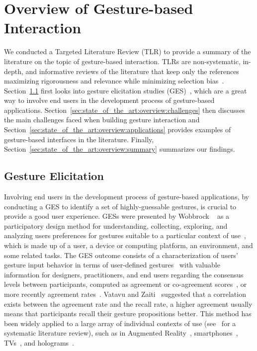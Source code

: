 \section{Overview of Gesture-based Interaction} \label{sec:state_of_the_art:overview}
We conducted a Targeted Literature Review (TLR) to provide a summary of the literature on the topic of gesture-based interaction. TLRs are non-systematic, in-depth, and informative reviews of the literature that keep only the references maximizing rigorousness and relevance while minimizing selection bias~\cite{Kysh:2013}.
%
Section~\ref{sec:state_of_the_art:overview:ges} first looks into gesture elicitation studies (GES)~\cite{Wobbrock:2009}, which are a great way to involve end users in the development process of gesture-based applications. 
Section~\ref{sec:state_of_the_art:overview:challenges} then discusses the main challenges faced when building gesture interaction and Section~\ref{sec:state_of_the_art:overview:applications} provides examples of gesture-based interfaces in the literature.
Finally, Section~\ref{sec:state_of_the_art:overview:summary} summarizes our findings.

\subsection{Gesture Elicitation} \label{sec:state_of_the_art:overview:ges}
Involving end users in the development process of gesture-based applications, \eg by conducting a GES to identify a set of highly-guessable gestures, is crucial to provide a good user experience.
GESs were presented by Wobbrock \etal~\cite{Wobbrock:2009} as a participatory design method for understanding, collecting, exploring, and analyzing users preferences for gestures suitable to a particular context of use~\cite{Calvary:2003}, which is made up of a user, a device or computing platform, an environment, and some related tasks. The GES outcome consists of a characterization of users' gesture input behavior in terms of user-defined gestures~\cite{Grijincu:2014} with valuable information for designers, practitioners, and end users regarding the consensus levels between participants, computed as agreement or co-agreement scores~\cite{Vatavu:2014b}, or more recently agreement rates~\cite{Vatavu:2015}.
Vatavu and Zaiti~\cite{Vatavu:2014b} suggested that a correlation exists between the agreement rate and the recall rate, \ie a higher agreement usually means that participants recall their gesture propositions better.
This method has been widely applied to a large array of individual contexts of use (see~\cite{Villarreal:2020} for a systematic literature review), such as in Augmented Reality~\cite{Piumsomboon:2013}, smartphones~\cite{Ruiz:2011}, TVs~\cite{Vatavu:2014b,Morris:2012,Dong:2015}, and holograms~\cite{Pham:2018}.

